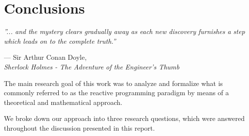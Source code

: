 \let\textcircled=\pgftextcircled
\chapter*{Conclusions}
\label{chap:discussion}


\epigraph{\hspace{4ex}\textit{''... and the mystery clears gradually away as each new discovery furnishes a step which leads on to the complete truth.''}}{--- Sir Arthur Conan Doyle,\\ \textit{Sherlock Holmes - The Adventure of the Engineer's Thumb}}

The main research goal of this work was to analyze and formalize what is commonly referred to as the reactive programming paradigm by means of a theoretical and mathematical approach. 

We broke down our approach into three research questions, which were answered throughout the discussion presented in this report.


